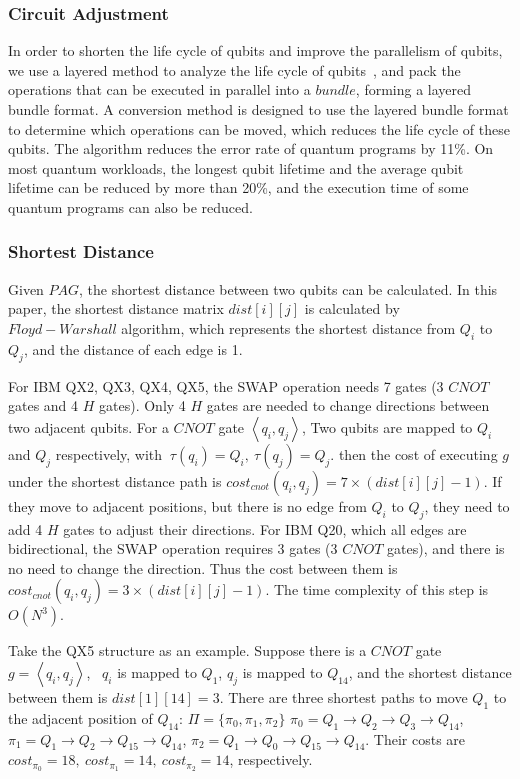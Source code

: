 \documentclass[runningheads]{llncs}
\begin{document}
\subsubsection{Circuit Adjustment}
In order to shorten the life cycle of qubits and improve the parallelism of qubits, 
we use a layered method to analyze the life cycle of qubits~\cite{2019Zhang}, 
and pack the operations that can be executed in parallel into a $bundle$, forming a layered bundle format.
A conversion method is designed to use the layered bundle format to determine 
which operations can be moved, which reduces the life cycle of these qubits.
The algorithm reduces the error rate of quantum programs by 11\%. 
On most quantum workloads, 
the longest qubit lifetime and the average qubit lifetime 
can be reduced by more than 20\%, 
and the execution time of some quantum programs can also be reduced.
\subsubsection{Shortest Distance}
Given $PAG$, 
the shortest distance between two qubits can be calculated. 
In this paper, the shortest distance matrix $dist[i][j]$ is calculated by $Floyd-Warshall$ algorithm, 
which represents the shortest distance from $Q_{i}$ to $Q_{j}$, 
and the distance of each edge is 1. 

For IBM QX2, QX3, QX4, QX5, the SWAP operation needs 7 gates 
(3 $CNOT$ gates and 4 $H$ gates). 
Only 4 $H$ gates are needed to change directions between two adjacent qubits. 
For a $CNOT$ gate $\left \langle  q_{i},q_{j} \right \rangle $,
Two qubits are mapped to $Q_{i}$ and $Q_{j}$ respectively, with $\ \tau(q_{i})=Q_{i},\ \tau(q_{j})=Q_{j}$.
then the cost of executing $g$ under the shortest distance path is $cost_{cnot}(q_{i},q_{j})=7 \times( dist[i][j]-1)$.
If they move to adjacent positions, but there is no edge from $Q_{i}$ to $Q_{j}$,
they need to add 4 $H$ gates to adjust their directions.
For IBM Q20, which all edges are bidirectional, 
the SWAP operation requires 3 gates (3 $CNOT$ gates), 
and there is no need to change the direction. 
Thus the cost between them is $cost_{cnot}(q_{i},q_{j})=3 \times( dist[i][j]-1)$.
The time complexity of this step is $O (N^{3})$.
\begin{example}
	Take the QX5 structure as an example.
Suppose there is a $CNOT$ gate $g=\left \langle  q_{i}, q_{j} \right \rangle $, \ $q_{i}$ is mapped to $Q_{1}$, 
 $q_{j}$ is mapped to $Q_{14}$, 
and the shortest distance between them  is $dist[1][14]=3$.
There are three shortest paths to move $Q_{1}$ to the adjacent position of $Q_{14}$:
$\Pi=\{\pi_{0},\pi_{1},\pi_{2}\}$
$\pi_{0}={Q_{1}\rightarrow Q_{2} \rightarrow Q_{3} \rightarrow Q_{14}}$,
$\pi_{1}={Q_{1}\rightarrow Q_{2} \rightarrow Q_{15} \rightarrow Q_{14}}$,
$\pi_{2}={Q_{1}\rightarrow Q_{0} \rightarrow Q_{15} \rightarrow Q_{14}}$.
Their costs are 
$cost_{\pi_{0}}=18,\ cost_{\pi_{1}}=14,\ cost_{\pi_{2}}=14$, respectively.
\end{example}
\end{document}
